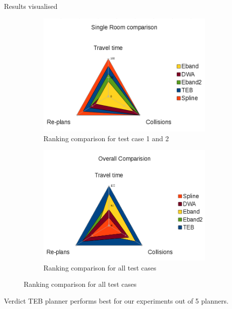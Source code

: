 \documentclass{beamer}
\begin{document}
\begin{frame}[t]{Results visualised}
    \begin{figure}[H]
        \centering
        \begin{subfigure}[b]{0.450\linewidth}
            \centering
            \includegraphics[width=0.95\textwidth]{single_room_web_graph.png}
            \caption{Ranking comparison for test case 1 and 2}
        \end{subfigure}%
        \begin{subfigure}[b]{0.450\linewidth}
            \centering
            \includegraphics[width=0.95\textwidth]{overall_web_graph.png}
            \caption{Ranking comparison for all test cases}
        \end{subfigure}
    \end{figure}
    \begin{block}{Verdict}
        TEB planner performs best for our experiments out of 5 planners.
    \end{block}
\end{frame}
\end{document}
